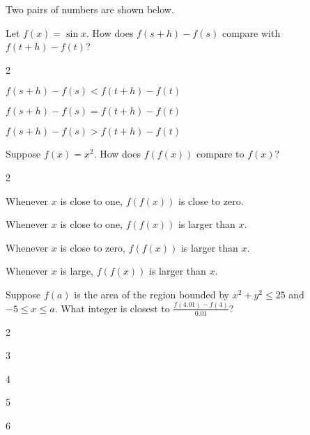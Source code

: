 \documentclass[12pt]{ximera}
\renewenvironment{multipleChoice}
{\begin{trivlist}\item[\hskip\labelsep\small\bfseries Choose the best answer:]
\hfil\begin{enumerate}\begin{multicols}{2}}
 {\end{multicols}\end{enumerate}\end{trivlist}}
\renewcommand{\choice}[2][]{\item \begin{minipage}[t]{2in}#2\end{minipage}\ifthenelse{\boolean{#1}}{\ifhandout \else  \fi}{}}
\begin{document}
\begin{minipage}{\textwidth}
\begin{problem}
  Two pairs of numbers are shown below.
  \begin{image}
  \end{image}
  Let $f(x) = \sin x$.  How does $f(s+h)-f(s)$ compare with $f(t+h) - f(t)$?
  \begin{multipleChoice}
    \choice{$f(s+h) - f(s) < f(t+h) - f(t)$}
    \choice{$f(s+h) - f(s) = f(t+h) - f(t)$}
    \choice[correct]{$f(s+h) - f(s) > f(t+h) - f(t)$}
  \end{multipleChoice}
\end{problem}
\end{minipage}

\vspace{6ex}

\begin{minipage}{\textwidth}
\begin{problem}
  Suppose $f(x) = x^2$.  How does $f(f(x))$ compare to $f(x)$?
  \begin{multipleChoice}
    \choice{Whenever $x$ is close to one, $f(f(x))$ is close to zero.}
    \choice{Whenever $x$ is close to one, $f(f(x))$ is larger than $x$.}
    \choice{Whenever $x$ is close to zero, $f(f(x))$ is larger than $x$.}
    \choice[correct]{Whenever $x$ is large, $f(f(x))$ is larger than $x$.}
  \end{multipleChoice}
\end{problem}
\end{minipage}

\vspace{6ex}

\begin{minipage}{\textwidth}
\begin{problem}
  Suppose $f(a)$ is the area of the region bounded by $x^2 + y^2 \leq 25$ and $-5 \leq x \leq a$.  What integer is closest to $\frac{f(4.01) - f(4)}{0.01}$?
  \begin{multipleChoice}
    \choice{3}
    \choice{4}
    \choice{5}
    \choice[correct]{6}
  \end{multipleChoice}
\end{problem}
\end{minipage}
\end{document}
